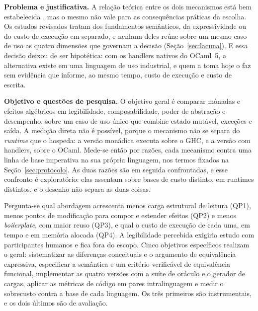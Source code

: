 \documentclass[12pt]{article}
\begin{document}
\medskip
\noindent\textbf{Problema e justificativa.} A relação teórica entre os dois
mecanismos está bem estabelecida \cite{schrijvers:19,forster:17}, mas o mesmo
não vale para as consequências práticas da escolha. Os estudos revisados tratam
dos fundamentos semânticos, da expressividade ou do custo de execução em
separado, e nenhum deles reúne sobre um mesmo caso de uso as quatro
dimensões que governam a decisão (Seção~\ref{sec:lacuna}). E essa decisão
deixou de ser hipotética: com os handlers nativos do OCaml~5, a
alternativa existe em uma linguagem de uso industrial, e quem a toma hoje o faz
sem evidência que informe, ao mesmo tempo, custo de execução e custo de
escrita.

\medskip
\noindent\textbf{Objetivo e questões de pesquisa.} O objetivo geral é
comparar mônadas e efeitos algébricos em legibilidade, composabilidade, poder
de abstração e desempenho, sobre um caso de uso único que combine estado
mutável, exceções e saída. A medição direta não é possível, porque o mecanismo
não se separa do \textit{runtime} que o hospeda: a versão monádica executa
sobre o GHC, e a versão com handlers, sobre o OCaml. Mede-se então por razões, cada
mecanismo contra uma linha de base imperativa na sua própria linguagem, nos
termos fixados na Seção~\ref{sec:protocolo}. As duas razões são em seguida
confrontadas, e esse confronto é exploratório: elas assentam sobre bases de
custo distinto, em runtimes distintos, e o desenho não separa as duas
coisas.

Pergunta-se qual abordagem acrescenta menos carga estrutural de leitura (QP1),
menos pontos de modificação para compor e estender efeitos (QP2) e menos
\textit{boilerplate}, com maior reuso (QP3), e qual o custo de execução de cada
uma, em tempo e em memória alocada (QP4). A legibilidade percebida exigiria
estudo com participantes humanos e fica fora do escopo. Cinco objetivos
específicos realizam o geral: sistematizar as diferenças conceituais e o
argumento de equivalência expressiva, especificar a semântica e um critério
verificável de equivalência funcional, implementar as quatro versões com a
suíte de oráculo e o gerador de cargas, aplicar as métricas de código em pares
intralinguagem e medir o sobrecusto contra a base de cada linguagem. Os três
primeiros são instrumentais, e os dois últimos são de avaliação.
\end{document}
